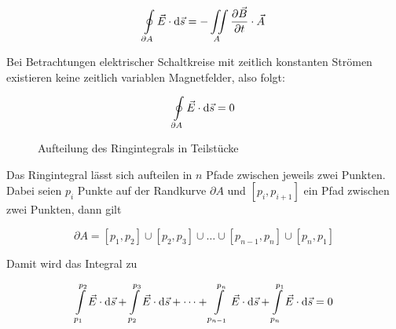 \documentclass[a4paper,german,12pt,smallheadings]{scrartcl}
\begin{document}
\begin{equation}
  \oint\limits_{\partial A} \vec{E} \cdot \dif \vec{s} = - \iint\limits_{A} \frac{\partial \vec{B}}{\partial t} \cdot \vec{A}
\end{equation}


Bei Betrachtungen elektrischer Schaltkreise mit zeitlich konstanten Strömen
existieren keine zeitlich variablen Magnetfelder, also folgt:

\begin{equation}
  \oint\limits_{\partial A} \vec{E} \cdot \dif \vec{s} = 0
\end{equation}


\begin{figure}[H]
  \begin{center}
    \caption{Aufteilung des Ringintegrals in Teilstücke}
  \end{center}
\end{figure}

Das Ringintegral lässt sich aufteilen in $n$ Pfade zwischen jeweils zwei
Punkten. Dabei seien $p_i$ Punkte auf der Randkurve $\partial A$ und $[p_{i},
p_{i+1}]$ ein Pfad zwischen zwei Punkten, dann gilt

\begin{equation}
  \partial A = [p_1, p_2] \cup [p_2, p_3] \cup \dots \cup [p_{n-1}, p_n] \cup [p_n, p_1]
\end{equation}

Damit wird das Integral zu

\begin{equation}
  \int\limits_{p_1}^{p_2} \vec{E} \cdot \dif \vec{s} +
  \int\limits_{p_2}^{p_3} \vec{E} \cdot \dif \vec{s} +
  \dots +
  \int\limits_{p_{n-1}}^{p_n} \vec{E} \cdot \dif \vec{s} +
  \int\limits_{p_{n}}^{p_1} \vec{E} \cdot \dif \vec{s}
  = 0
\end{equation}
\end{document}
